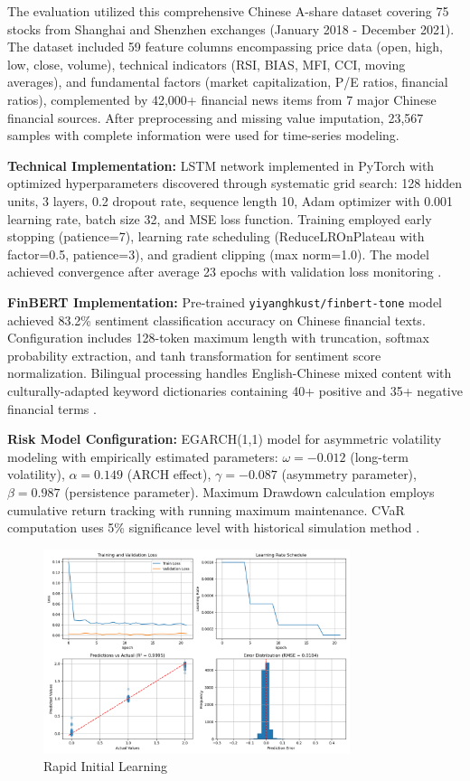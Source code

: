 \documentclass[3p,times,procedia]{elsarticle}
\begin{document}
The evaluation utilized this comprehensive Chinese A-share dataset covering 75 stocks from Shanghai and Shenzhen exchanges (January 2018 - December 2021). The dataset included 59 feature columns encompassing price data (open, high, low, close, volume), technical indicators (RSI, BIAS, MFI, CCI, moving averages), and fundamental factors (market capitalization, P/E ratios, financial ratios), complemented by 42,000+ financial news items from 7 major Chinese financial sources. After preprocessing and missing value imputation, 23,567 samples with complete information were used for time-series modeling.

\textbf{Technical Implementation:} LSTM network implemented in PyTorch with optimized hyperparameters discovered through systematic grid search: 128 hidden units, 3 layers, 0.2 dropout rate, sequence length 10, Adam optimizer with 0.001 learning rate, batch size 32, and MSE loss function. Training employed early stopping (patience=7), learning rate scheduling (ReduceLROnPlateau with factor=0.5, patience=3), and gradient clipping (max norm=1.0). The model achieved convergence after average 23 epochs with validation loss monitoring \cite{Kingma2015}.

\textbf{FinBERT Implementation:} Pre-trained \texttt{yiyanghkust/finbert-tone} model achieved 83.2\% sentiment classification accuracy on Chinese financial texts. Configuration includes 128-token maximum length with truncation, softmax probability extraction, and tanh transformation for sentiment score normalization. Bilingual processing handles English-Chinese mixed content with culturally-adapted keyword dictionaries containing 40+ positive and 35+ negative financial terms \cite{Araci2019}.

\textbf{Risk Model Configuration:} EGARCH(1,1) model for asymmetric volatility modeling with empirically estimated parameters: $\omega = -0.012$ (long-term volatility), $\alpha = 0.149$ (ARCH effect), $\gamma = -0.087$ (asymmetry parameter), $\beta = 0.987$ (persistence parameter). Maximum Drawdown calculation employs cumulative return tracking with running maximum maintenance. CVaR computation uses 5\% significance level with historical simulation method \cite{Nelson1991}.

\begin{figure}[!ht]
    \centering
    \includegraphics[width=0.80\textwidth]{Picture2.png}
    \caption{Rapid Initial Learning}
    \label{fig:learning_curve}
\end{figure}
\end{document}

